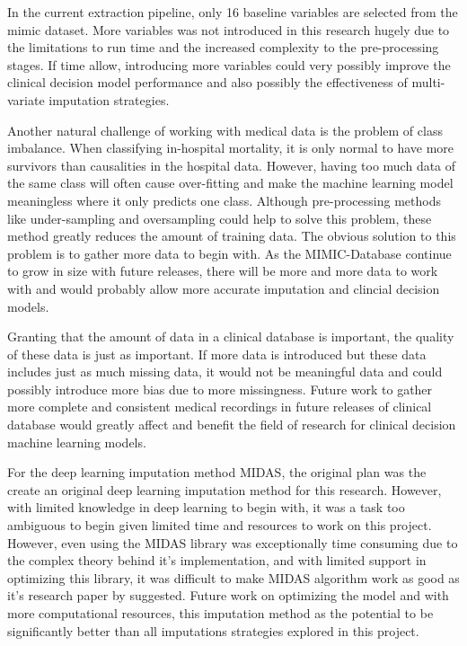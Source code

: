 \documentclass{l4proj}
\begin{document}
In the current extraction pipeline, only 16 baseline variables are selected from the mimic dataset. More variables was not introduced in this research hugely due to the limitations to run time and the increased complexity to the pre-processing stages. If time allow, introducing more variables could very possibly improve the clinical decision model performance and also possibly the effectiveness of multi-variate imputation strategies.

Another natural challenge of working with medical data is the problem of class imbalance. When classifying in-hospital mortality, it is only normal to have more survivors than causalities in the hospital data. However, having too much data of the same class will often cause over-fitting and make the machine learning model meaningless where it only predicts one class. Although pre-processing methods like under-sampling and oversampling could help to solve this problem, these method greatly reduces the amount of training data. The obvious solution to this problem is to gather more data to begin with. As the MIMIC-Database continue to grow in size with future releases, there will be more and more data to work with and would probably allow more accurate imputation and clincial decision models. 

Granting that the amount of data in a clinical database is important, the quality of these data is just as important. If more data is introduced but these data includes just as much missing data, it would not be meaningful data and could possibly introduce more bias due to more missingness. Future work to gather more complete and consistent medical recordings in future releases of clinical database would greatly affect and benefit the field of research for clinical decision machine learning models.

For the deep learning imputation method MIDAS, the original plan was the create an original deep learning imputation method for this research. However, with limited knowledge in deep learning to begin with, it was a task too ambiguous to begin given limited time and resources to work on this project. However, even using the MIDAS library was exceptionally time consuming due to the complex theory behind it's implementation, and with limited support in optimizing this library, it was difficult to make MIDAS algorithm work as good as it's research paper by \cite{lall_robinson_2022} suggested. Future work on optimizing the model and with more computational resources, this imputation method as the potential to be significantly better than all imputations strategies explored in this project.
\end{document}
